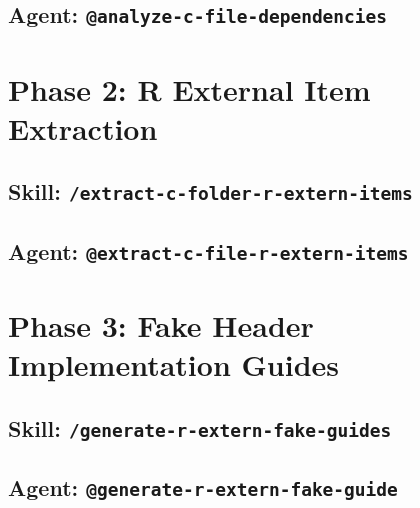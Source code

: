 \documentclass[12pt]{article}
\begin{document}


\subsection{Agent: \texttt{@analyze-c-file-dependencies}}
\label{app:agent:analyze-c-file-dependencies}



\section{Phase 2: R External Item Extraction}
\label{app:phase2}

\subsection{Skill: \texttt{/extract-c-folder-r-extern-items}}
\label{app:skill:extract-c-folder-r-extern-items}



\subsection{Agent: \texttt{@extract-c-file-r-extern-items}}
\label{app:agent:extract-c-file-r-extern-items}



\section{Phase 3: Fake Header Implementation Guides}
\label{app:phase3}

\subsection{Skill: \texttt{/generate-r-extern-fake-guides}}
\label{app:skill:generate-r-extern-fake-guides}



\subsection{Agent: \texttt{@generate-r-extern-fake-guide}}
\label{app:agent:generate-r-extern-fake-guide}
\end{document}
